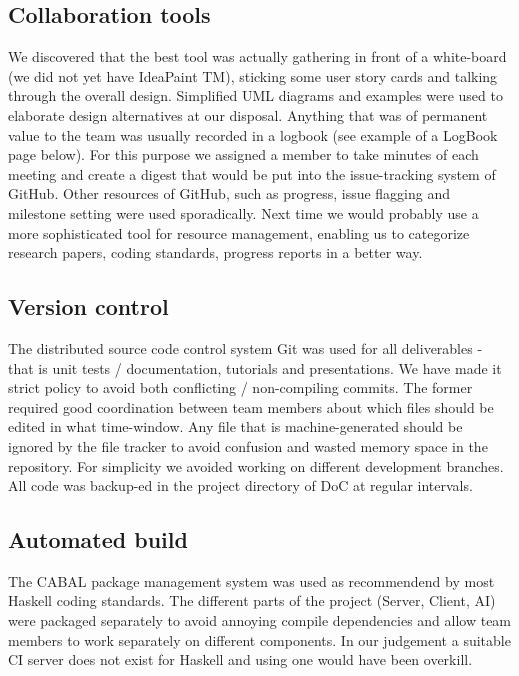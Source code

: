 \documentclass[pdftex,11pt,a4paper]{report}
\begin{document}
\subsection{Collaboration tools}
We discovered that the best tool was actually gathering in front of a
white-board (we did not yet have IdeaPaint TM), sticking some user
story cards and talking through the overall design. Simplified UML
diagrams and examples were used to elaborate design alternatives at
our disposal. Anything that was of permanent value to the team was
usually recorded in a logbook (see example of a LogBook page
below). For this purpose we assigned a member to take minutes of each
meeting and create a digest that would be put into the issue-tracking
system of GitHub. Other resources of GitHub, such as progress, issue
flagging and milestone setting were used sporadically. Next time we
would probably use a more sophisticated tool for resource management,
enabling us to categorize research papers, coding standards, progress
reports in a better way.

\subsection{Version control}
The distributed source code control system Git was used for all
deliverables - that is unit tests / documentation, tutorials and
presentations. We have made it strict policy to avoid both conflicting
/ non-compiling commits. The former required good coordination between
team members about which files should be edited in what
time-window. Any file that is machine-generated should be ignored by
the file tracker to avoid confusion and wasted memory space in the
repository. For simplicity we avoided working on different development
branches. All code was backup-ed in the project directory of DoC at
regular intervals.

\subsection{Automated build}
The CABAL package management system was used as recommendend by most
Haskell coding standards. The different parts of the project (Server,
Client, AI) were packaged separately to avoid annoying compile
dependencies and allow team members to work separately on different
components. In our judgement a suitable CI server does not exist for
Haskell and using one would have been overkill.

\end{document}
